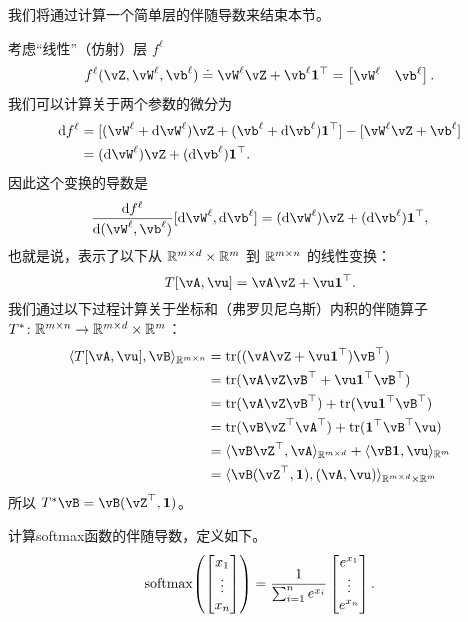 \documentclass[../../book-main.tex]{subfiles}
\begin{document}
我们将通过计算一个简单层的伴随导数来结束本节。
\begin{example}
    考虑“线性”（仿射）层 \(f^{\ell}\)
    \begin{equation}
        f^{\ell}(\vZ, \vW^{\ell}, \vb^{\ell}) \doteq \vW^{\ell}\vZ + \vb^{\ell}\vone^{\top} = \mat{\vW^{\ell} & \vb^{\ell}}.
    \end{equation}
    我们可以计算关于两个参数的微分为
    \begin{align}
        \odif{f}^{\ell}
        &= [(\vW^{\ell} + \odif{\vW}^{\ell})\vZ + (\vb^{\ell} + \odif{\vb}^{\ell})\vone^{\top}] - [\vW^{\ell}\vZ + \vb^{\ell}] \\ 
        &= (\odif{\vW}^{\ell})\vZ + (\odif{\vb}^{\ell})\vone^{\top}.
    \end{align}
    因此这个变换的导数是
    \begin{equation}
        \odv{f^{\ell}}{(\vW^{\ell}, \vb^{\ell})}[\odif{\vW}^{\ell}, \odif{\vb}^{\ell}] = (\odif{\vW}^{\ell})\vZ + (\odif{\vb}^{\ell})\vone^{\top},
    \end{equation}
    也就是说，表示了以下从 \(\mathbb{R}^{m \times d} \times \mathbb{R}^{m}\) 到 \(\mathbb{R}^{m \times n}\) 的线性变换：
    \begin{equation}
        T[\vA, \vu] = \vA\vZ + \vu\vone^{\top}.
    \end{equation}
    我们通过以下过程计算关于坐标和（弗罗贝尼乌斯）内积的伴随算子 \(T^{*} \colon \mathbb{R}^{m \times n} \to \mathbb{R}^{m \times d} \times \mathbb{R}^{m}\)：
    \begin{align}
        \ip{T[\vA, \vu]}{\vB}_{\R^{m \times n}} 
        &= \tr((\vA\vZ + \vu\vone^{\top})\vB^{\top}) \\
        &= \tr(\vA\vZ\vB^{\top} + \vu\vone^{\top}\vB^{\top}) \\
        &= \tr(\vA\vZ\vB^{\top}) + \tr(\vu\vone^{\top}\vB^{\top}) \\
        &= \tr(\vB\vZ^{\top}\vA^{\top}) + \tr(\vone^{\top}\vB^{\top}\vu) \\
        &= \ip{\vB\vZ^{\top}}{\vA}_{\R^{m \times d}} + \ip{\vB\vone}{\vu}_{\R^{m}} \\
        &= \ip{\vB(\vZ^{\top}, \vone)}{(\vA, \vu)}_{\R^{m \times d} \times \R^{m}}
    \end{align}
    所以 \(T^{*}\vB = \vB(\vZ^{\top}, \vone)\)。
\end{example}

\begin{example}
    计算softmax函数的伴随导数，定义如下。
    \begin{equation}
        \softmax\rp{\mat{x_{1} \\ \vdots \\ x_{n}}} = \frac{1}{\sum_{i = 1}^{n}e^{x_{i}}}\mat{e^{x_{1}} \\ \vdots \\ e^{x_{n}}}.
    \end{equation}
\end{example}
\end{document}
